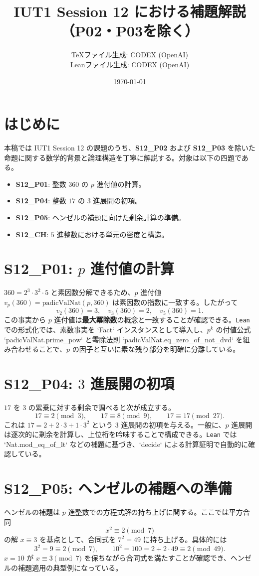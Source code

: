\documentclass[12pt]{ltjsarticle}
\title{IUT1 Session 12 における補題解説（P02・P03を除く）}
\author{TeXファイル生成: CODEX (OpenAI)\\Leanファイル生成: CODEX (OpenAI)}
\date{\today}
\begin{document}
\maketitle

\section{はじめに}
本稿では IUT1 Session 12 の課題のうち、\textbf{S12\_P02} および \textbf{S12\_P03} を除いた命題に関する数学的背景と論理構造を丁寧に解説する。対象は以下の四題である。
\begin{itemize}
  \item \textbf{S12\_P01}: 整数 $360$ の $p$ 進付値の計算。
  \item \textbf{S12\_P04}: 整数 $17$ の $3$ 進展開の初項。
  \item \textbf{S12\_P05}: ヘンゼルの補題に向けた剰余計算の準備。
  \item \textbf{S12\_CH}: $5$ 進整数における単元の密度と構造。
\end{itemize}

\section{S12\_P01: $p$ 進付値の計算}
$360=2^3\cdot3^2\cdot5$ と素因数分解できるため、$p$ 進付値 $v_p(360)=\mathrm{padicValNat}(p,360)$ は素因数の指数に一致する。したがって
\[
 v_2(360)=3,\quad v_3(360)=2,\quad v_5(360)=1.
\]
この事実から $p$ 進付値は\textbf{最大冪除数}の概念と一致することが確認できる。\texttt{Lean} での形式化では、素数事実を `Fact` インスタンスとして導入し、$p^k$ の付値公式 `padicValNat.prime_pow` と零除法則 `padicValNat.eq_zero_of_not_dvd` を組み合わせることで、$p$ の因子と互いに素な残り部分を明確に分離している。

\section{S12\_P04: $3$ 進展開の初項}
$17$ を $3$ の累乗に対する剰余で調べると次が成立する。
\[
17 \equiv 2 \pmod 3,\qquad 17 \equiv 8 \pmod 9,\qquad 17 \equiv 17 \pmod{27}.
\]
これは $17 = 2 + 2\cdot3 + 1\cdot3^2$ という $3$ 進展開の初項を与える。一般に、$p$ 進展開は逐次的に剰余を計算し、上位桁を吟味することで構成できる。\texttt{Lean} では `Nat.mod_eq_of_lt` などの補題に基づき、`decide` による計算証明で自動的に確認している。

\section{S12\_P05: ヘンゼルの補題への準備}
ヘンゼルの補題は $p$ 進整数での方程式解の持ち上げに関する。ここでは平方合同
\[
 x^2 \equiv 2 \pmod 7
\]
の解 $x\equiv 3$ を基点として、合同式を $7^2=49$ に持ち上げる。具体的には
\[
3^2 = 9 \equiv 2 \pmod 7,\qquad 10^2 = 100 = 2 + 2\cdot49 \equiv 2 \pmod{49}.
\]
$x=10$ が $x \equiv 3 \pmod 7$ を保ちながら合同式を満たすことが確認でき、ヘンゼルの補題適用の典型例になっている。
\end{document}

